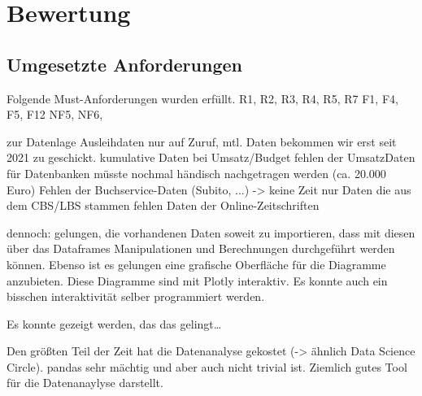 \section{Bewertung}

\subsection{Umgesetzte Anforderungen}
    Folgende Must-Anforderungen wurden erfüllt.
    R1, R2, R3, R4, R5, R7
    F1, F4, F5, F12
    NF5, NF6, 


zur Datenlage 
Ausleihdaten nur auf Zuruf, mtl. Daten bekommen wir erst seit 2021 zu geschickt.
kumulative Daten bei Umsatz/Budget
fehlen der UmsatzDaten für Datenbanken müsste nochmal händisch nachgetragen werden (ca. 20.000 Euro)
Fehlen der Buchservice-Daten (Subito, ...) -> keine Zeit
nur Daten die aus dem CBS/LBS  stammen
fehlen Daten der Online-Zeitschriften

dennoch:
gelungen, die vorhandenen Daten soweit zu importieren, dass mit diesen über das Dataframes Manipulationen und Berechnungen
durchgeführt werden können. Ebenso ist es gelungen eine grafische Oberfläche für die Diagramme anzubieten. Diese Diagramme
sind mit Plotly interaktiv. Es konnte auch ein bisschen interaktivität selber programmiert werden.

Es konnte gezeigt werden, das das gelingt\dots

Den größten Teil der Zeit hat die Datenanalyse gekostet (-> ähnlich Data Science Circle). 
pandas sehr mächtig und aber auch nicht trivial ist. Ziemlich gutes Tool für die Datenanaylyse darstellt.


